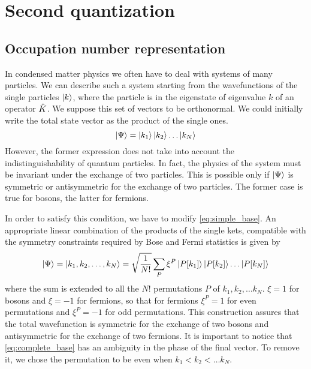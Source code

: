 \section{Second quantization}
\subsection{Occupation number representation}
In condensed matter physics we often have to deal with systems of many particles. We can describe such a system starting from the wavefunctions of the single particles $\ket{k}$, where the particle is in the eigenstate of eigenvalue $k$ of an operator $\hat{K}$. We suppose this set of vectors to be orthonormal. We could initially write the total state vector as the product of the single ones.
\begin{equation} \label{eq:simple_base}
    \ket{\Psi} = \ket{k_1}\ket{k_2}\dots\ket{k_N}
\end{equation}
However, the former expression does not take into account the indistinguishability of quantum particles. In fact, the physics of the system must be invariant under the exchange of two particles. This is possible only if $\ket{\Psi}$ is symmetric or antisymmetric for the exchange of two particles. The former case is true for bosons, the latter for fermions. %

In order to satisfy this condition, we have to modify \cref{eq:simple_base}. An appropriate linear combination of the products of the single kets, compatible with the symmetry constraints required by Bose and Fermi statistics is given by
\begin{equation} \label{eq:complete_base}
    \ket{\Psi} = \ket{k_1, k_2, \dots, k_N} = \sqrt{\frac{1}{N!}} \sum_P \xi^P \ket{P[k_1]}\ket{P[k_2]}\dots\ket{P[k_N]}
\end{equation}
where the sum is extended to all the $N!$ permutations $P$ of ${k_1, k_2, \dots k_N}$. $\xi = 1$ for bosons and $\xi = -1$ for fermions, so that for fermions $\xi^P = 1$ for even permutations and $\xi^P = -1$ for odd permutations. This construction assures that the total wavefunction is symmetric for the exchange of two bosons and antisymmetric for the exchange of two fermions. It is important to notice that \cref{eq:complete_base} has an ambiguity in the phase of the final vector. To remove it, we chose the permutation to be even when $k_1 < k_2 < \dots k_N$.

